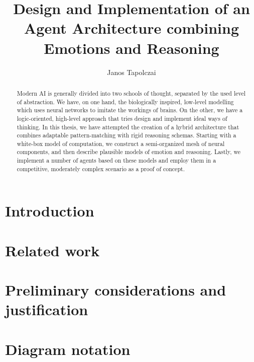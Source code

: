 \documentclass[]{scrartcl}
\title{{\huge Design and Implementation of an Agent Architecture combining Emotions and Reasoning}}
\author{Janos Tapolczai}
\begin{document}
\maketitle


\begin{abstract}
Modern AI is generally divided into two schools of thought, separated by the used level of abstraction. We have, on one hand, the biologically inspired, low-level modelling which uses neural networks to imitate the workings of brains. On the other, we have a logic-oriented, high-level approach that tries design and implement ideal ways of thinking. In this thesis, we have attempted the creation of a hybrid architecture that combines adaptable pattern-matching with rigid reasoning schemas. Starting with a white-box model of computation, we construct a semi-organized mesh of neural components, and then describe plausible models of emotion and reasoning. Lastly, we implement a number of agents based on these models and employ them in a competitive, moderately complex scenario as a proof of concept.
\end{abstract}

\newpage

\hypersetup{linkcolor=black}
\tableofcontents
\hypersetup{linkcolor=DeepBlue}
\newpage

\begingroup
\let\clearpage\relax

\section{Introduction}



\section{Related work}



\section{Preliminary considerations and justification}\label{sec:preliminaries}



\section{Diagram notation}


\end{document}
